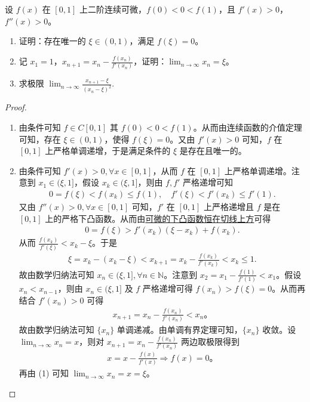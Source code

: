 \documentclass[lang=cn,newtx,10pt,scheme=chinese]{../Template/elegantbook}
\begin{document}
\begin{example}
设 $f(x)$ 在 $[0,1]$ 上二阶连续可微，$f(0)<0<f(1)$，且 $f'(x)>0$，$f''(x)>0$。
\begin{enumerate}[(1)]
\item 证明：存在唯一的 $\xi \in (0,1)$，满足 $f(\xi) = 0$。
\item 记 $x_1 = 1$，$x_{n+1} = x_n - \frac{f(x_n)}{f'(x_n)}$，证明：$\lim_{n \to \infty} x_n = \xi$。
\item 求极限 $\lim_{n \to \infty} \frac{x_{n+1} - \xi}{(x_n - \xi)^2}$.
\end{enumerate}
\end{example}
\begin{proof}
\begin{enumerate}[(1)]
\item 由条件可知 $f \in C[0,1]$ 其 $f(0) < 0 < f(1)$。从而由连续函数的介值定理可知，存在 $\xi \in (0,1)$，使得 $f(\xi) = 0$。又由 $f'(x) > 0$ 可知，$f$ 在 $[0,1]$ 上严格单调递增，于是满足条件的 $\xi$ 是存在且唯一的。

\item 由条件可知 $f'(x) > 0, \forall x \in [0,1]$，从而 $f$ 在 $[0,1]$ 上严格单调递增。注意到 $x_1 \in (\xi, 1]$，假设 $x_k \in (\xi, 1]$，则由 $f, f'$ 严格递增可知
\begin{align*}
0 = f(\xi) < f(x_k) \leqslant f(1), \quad f'(\xi) < f'(x_k) \leqslant f'(1).
\end{align*}
又由 $f''(x) > 0, \forall x \in [0,1]$ 可知，$f'$ 在 $[0,1]$ 上严格递增且 $f$ 是在 $[0,1]$ 上的严格下凸函数。从而由\hyperref[Basis of Analytics-可微的下凸函数恒在切线上方]{可微的下凸函数恒在切线上方}可得
\begin{align*}
0 = f(\xi) > f'(x_k)(\xi - x_k) + f(x_k).
\end{align*}
从而 $\frac{f(x_k)}{f'(\xi)} < x_k - \xi$。于是
\begin{align*}
\xi = x_k - (x_k - \xi) < x_{k+1} = x_k - \frac{f(x_k)}{f'(x_k)} < x_k \leqslant 1.
\end{align*}
故由数学归纳法可知 $x_n \in (\xi, 1], \forall n \in \mathbb{N}$。注意到 $x_2 = x_1 - \frac{f(1)}{f'(1)} < x_1$。假设 $x_n < x_{n-1}$，则由 $x_n \in (\xi, 1]$ 及 $f$ 严格递增可得 $f(x_n) > f(\xi) = 0$。从而再结合 $f'(x_n) > 0$ 可得
\begin{align*}
x_{n+1} = x_n - \frac{f(x_n)}{f'(x_n)} < x_n。
\end{align*}
故由数学归纳法可知 $\{x_n\}$ 单调递减。由单调有界定理可知，$\{x_n\}$ 收敛。设 $\lim_{n \to \infty} x_n = x$，则对 $x_{n+1} = x_n - \frac{f(x_n)}{f'(x_n)}$ 两边取极限得到
\begin{align*}
x = x - \frac{f(x)}{f'(x)} \Rightarrow f(x) = 0。
\end{align*}
再由 (1) 可知 $\lim_{n \to \infty} x_n = x = \xi$。


\end{enumerate}
\end{proof}
\end{document}
